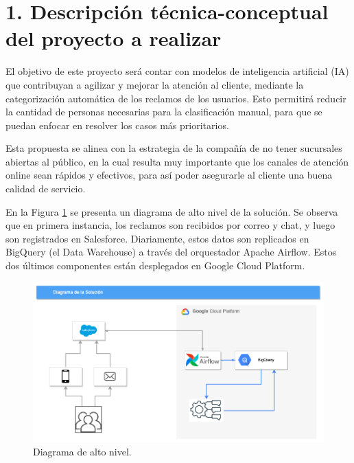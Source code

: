 \documentclass[
11pt, %
]{charter}
\begin{document}
\section{1. Descripción técnica-conceptual del proyecto a realizar}
\label{sec:descripcion}



El objetivo de este proyecto será contar con modelos de inteligencia artificial (IA) que contribuyan a agilizar y mejorar la atención al cliente, mediante la categorización automática de los reclamos de los usuarios. Esto permitirá reducir la cantidad de personas necesarias para la clasificación manual, para que se puedan enfocar en resolver los casos más prioritarios.

Esta propuesta se alinea con la estrategia de la compañía de no tener sucursales abiertas al público, en la cual resulta muy importante que los canales de atención online sean rápidos y efectivos, para así poder asegurarle al cliente una buena calidad de servicio.

En la Figura \ref{fig:figura1} se presenta un diagrama de alto nivel de la solución. Se observa que en primera instancia, los reclamos son recibidos por correo y chat, y luego son registrados en Salesforce.
Diariamente, estos datos son replicados en BigQuery (el Data Warehouse) a través del orquestador Apache Airflow. Estos dos últimos componentes están desplegados en Google Cloud Platform. 

\begin{figure}[H]
\centering 
\includegraphics[width=.85\textwidth]{./Figuras/figura1.png}
\caption{Diagrama de alto nivel.}
\label{fig:figura1}
\end{figure}
\end{document}
